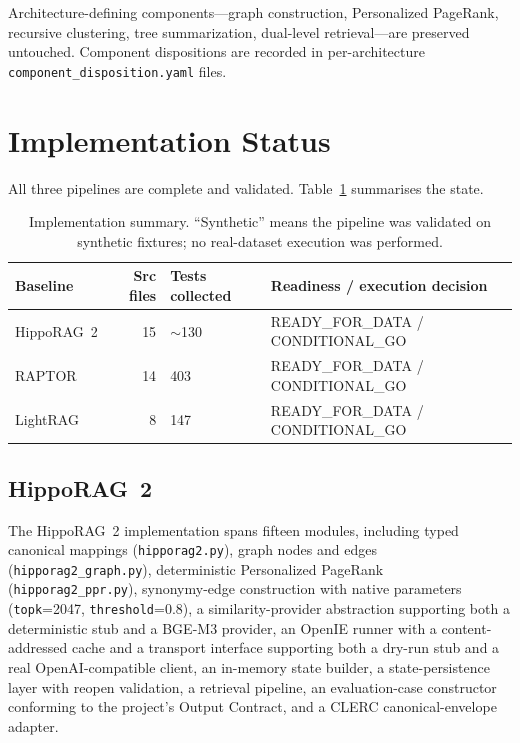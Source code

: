 \documentclass[11pt,a4paper]{article}
\begin{document}
Architecture-defining components---graph construction, Personalized PageRank, recursive clustering, tree summarization, dual-level retrieval---are preserved untouched. Component dispositions are recorded in per-architecture \texttt{component\_disposition.yaml} files.

\section{Implementation Status}
\label{sec:impl}

All three pipelines are complete and validated. Table~\ref{tab:impl} summarises the state.

\begin{table}[h]
\centering
\small
\begin{tabularx}{\linewidth}{lrlX}
\toprule
\textbf{Baseline} & \textbf{Src files} & \textbf{Tests collected} & \textbf{Readiness / execution decision} \\
\midrule
HippoRAG~2 & 15 & $\sim$130 & READY\_FOR\_DATA / CONDITIONAL\_GO \\
RAPTOR     & 14 & 403        & READY\_FOR\_DATA / CONDITIONAL\_GO \\
LightRAG   & 8  & 147        & READY\_FOR\_DATA / CONDITIONAL\_GO \\
\bottomrule
\end{tabularx}
\caption{Implementation summary. ``Synthetic'' means the pipeline was validated on synthetic fixtures; no real-dataset execution was performed.}
\label{tab:impl}
\end{table}

\subsection{HippoRAG~2}

The HippoRAG~2 implementation spans fifteen modules, including typed canonical mappings (\texttt{hipporag2.py}), graph nodes and edges (\texttt{hipporag2\_graph.py}), deterministic Personalized PageRank (\texttt{hipporag2\_ppr.py}), synonymy-edge construction with native parameters (\texttt{topk}=2047, \texttt{threshold}=0.8), a similarity-provider abstraction supporting both a deterministic stub and a BGE-M3 provider, an OpenIE runner with a content-addressed cache and a transport interface supporting both a dry-run stub and a real OpenAI-compatible client, an in-memory state builder, a state-persistence layer with reopen validation, a retrieval pipeline, an evaluation-case constructor conforming to the project's Output Contract, and a CLERC canonical-envelope adapter.
\end{document}
